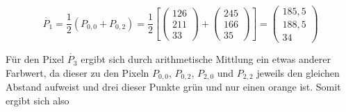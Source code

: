 \documentclass[
fontsize=10pt, 
listof = totoc,
parskip = half	
]{report}
\begin{document}
\begin{equation}
	\dot{P_1} = \frac{1}{2} \left(P_{0,0} + P_{0,2}\right) = 
	\frac{1}{2}
	\left[
		\begin{pmatrix}
			126\\
			211\\
			33
		\end{pmatrix}
		+
		\begin{pmatrix}
			245\\
			166\\
			35
		\end{pmatrix}
	\right] = 
	\begin{pmatrix}
		185,5\\
		188,5\\
		34
	\end{pmatrix}
\end{equation}

Für den Pixel $\dot{P_3}$ ergibt sich durch arithmetische Mittlung ein etwas anderer Farbwert, da dieser zu den Pixeln $P_{0,0}$, $P_{0,2}$, $P_{2,0}$ und $P_{2,2}$ jeweils den gleichen Abstand aufweist und drei dieser Punkte grün und nur einen orange ist. Somit ergibt sich also
\end{document}
